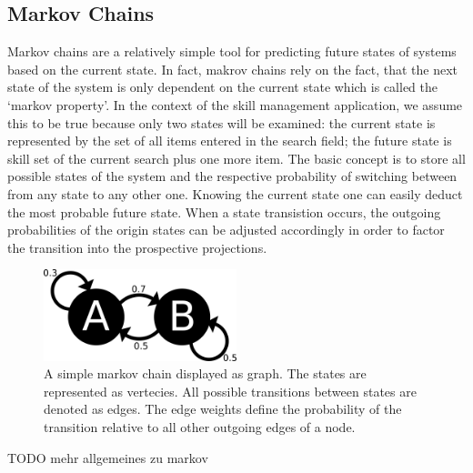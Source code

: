 \subsection{Markov Chains}
Markov chains are a relatively simple tool for predicting future states of systems based on the current state. In fact, makrov chains rely on the fact, that the next state of the system is only dependent on the current state which is called the `markov property'. In the context of the skill management application, we assume this to be true because only two states will be examined: the current state is represented by the set of all items entered in the search field; the future state is skill set of the current search plus one more item.
The basic concept is to store all possible states of the system and the respective probability of switching between from any state to any other one.
Knowing the current state one can easily deduct the most probable future state. When a state transistion occurs, the outgoing probabilities of the origin states
can be adjusted accordingly in order to factor the transition into the prospective projections.
\begin{figure}[!htp]
    \centering
    \includegraphics[width=0.5\textwidth]{images/markov-chain.png}
    \caption[Markov Chain]{A simple markov chain displayed as graph. The states are represented as vertecies. All possible transitions between states are denoted as edges. The edge weights define the probability of the transition relative to all other outgoing edges of a node.}
    \label{fig:markovchain}
\end{figure}

TODO mehr allgemeines zu markov

